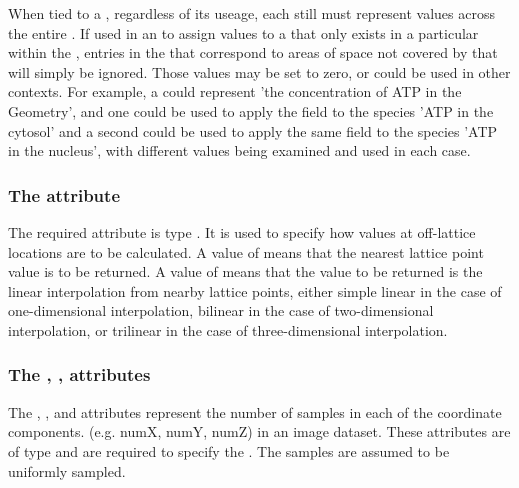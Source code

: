 When tied to a \SpatialSymbolReference, regardless of its useage, each \SampledField still must represent values across the entire \Geometry.  If used in an \InitialAssignment to assign values to a \Species that only exists in a particular \DomainType within the \Geometry, entries in the \SampledField that correspond to areas of space not covered by that \DomainType will simply be ignored.  Those values may be set to zero, or could be used in other contexts.  For example, a \SampledField could represent 'the concentration of ATP in the Geometry', and one \InitialAssignment could be used to apply the field to the species 'ATP in the cytosol' and a second \InitialAssignment could be used to apply the same field to the species 'ATP in the nucleus', with different values being examined and used in each case.


\subsubsection{The \fixttspace{} attribute}
The required  attribute is type . It is used to specify how values at off-lattice locations are to be calculated.  A value of  means that the nearest lattice point value is to be returned.  A value of  means that the value to be returned is the linear interpolation from nearby lattice points, either simple linear in the case of one-dimensional interpolation, bilinear in the case of two-dimensional interpolation, or trilinear in the case of three-dimensional interpolation.


\subsubsection{The \fixttspace{}, ,  attributes}
The , , and  attributes represent the number of samples in each of the coordinate components. (e.g. numX, numY, numZ) in an image dataset.  These attributes are of type  and are required to specify the \SampledField. The samples are assumed to be uniformly sampled.  

